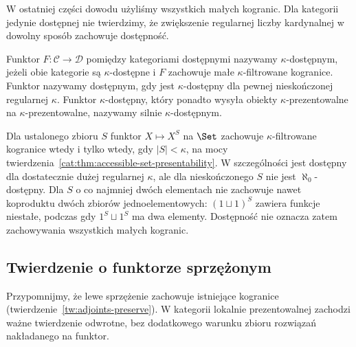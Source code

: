 W ostatniej części dowodu użyliśmy wszystkich małych kogranic. Dla kategorii jedynie dostępnej nie twierdzimy, że zwiększenie regularnej liczby kardynalnej w dowolny sposób zachowuje dostępność.

\begin{definicja}\label{cat:def:accessible-functor}
Funktor $F:\mathcal C\to\mathcal D$ pomiędzy kategoriami dostępnymi nazywamy $\kappa$-dostępnym, jeżeli obie kategorie są $\kappa$-dostępne i $F$ zachowuje małe $\kappa$-filtrowane kogranice. Funktor nazywamy dostępnym, gdy jest $\kappa$-dostępny dla pewnej nieskończonej regularnej $\kappa$. Funktor $\kappa$-dostępny, który ponadto wysyła obiekty $\kappa$-prezentowalne na $\kappa$-prezentowalne, nazywamy silnie $\kappa$-dostępnym.
\end{definicja}

\begin{przyklad}\label{cat:ex:accessible-power}
Dla ustalonego zbioru $S$ funktor $X\mapsto X^S$ na $\Set$ zachowuje $\kappa$-filtrowane kogranice wtedy i tylko wtedy, gdy $|S|<\kappa$, na mocy twierdzenia~\ref{cat:thm:accessible-set-presentability}. W szczególności jest dostępny dla dostatecznie dużej regularnej $\kappa$, ale dla nieskończonego $S$ nie jest $\aleph_0$-dostępny. Dla $S$ o co najmniej dwóch elementach nie zachowuje nawet koproduktu dwóch zbiorów jednoelementowych: $(1\sqcup1)^S$ zawiera funkcje niestałe, podczas gdy $1^S\sqcup1^S$ ma dwa elementy. Dostępność nie oznacza zatem zachowywania wszystkich małych kogranic.
\end{przyklad}

\subsection{Twierdzenie o funktorze sprzężonym}

Przypomnijmy, że lewe sprzężenie zachowuje istniejące kogranice (twierdzenie~\ref{tw:adjoints-preserve}). W kategorii lokalnie prezentowalnej zachodzi ważne twierdzenie odwrotne, bez dodatkowego warunku zbioru rozwiązań nakładanego na funktor.

